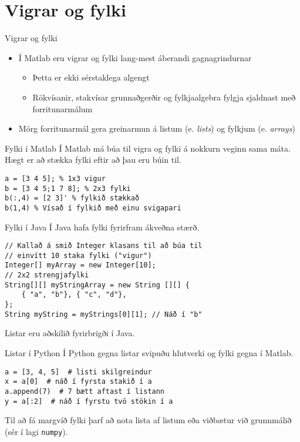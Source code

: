 \documentclass{beamer}
\begin{document}
\section{Vigrar og fylki}

\begin{frame}{Vigrar og fylki}
\begin{itemize}
 \item Í Matlab eru vigrar og fylki lang-mest áberandi gagnagrindurnar
 \begin{itemize}
  \item Þetta er ekki sérstaklega algengt
  \item Rökvísanir, stakvísar grunnaðgerðir og fylkjaalgebra fylgja sjaldnast með forritunarmálum
 \end{itemize}
 \item Mörg forritunarmál gera greinarmun á listum (e. \emph{lists}) og fylkjum (e. \emph{arrays})
\end{itemize}
\end{frame}

\begin{frame}[fragile]{Fylki í Matlab}
Í Matlab má búa til vigra og fylki á nokkurn veginn sama máta. Hægt er að stækka fylki eftir að þau eru búin til.
\begin{verbatim}
a = [3 4 5]; % 1x3 vigur
b = [3 4 5;1 7 8]; % 2x3 fylki
b(:,4) = [2 3]' % fylkið stækkað
b(1,4) % Vísað í fylkið með einu svigapari
\end{verbatim}
\end{frame}

\begin{frame}[fragile]{Fylki í Java}
\vspace{\baselineskip}
Í Java hafa fylki fyrirfram ákveðna stærð. 
\begin{verbatim}
// Kallað á smið Integer klasans til að búa til
// einvítt 10 staka fylki ("vigur")
Integer[] myArray = new Integer[10];
// 2x2 strengjafylki
String[][] myStringArray = new String [][] {
    { "a", "b"}, { "c", "d"}, 
};
String myString = myStrings[0][1]; // Náð í "b"
\end{verbatim}
Listar eru aðskilið fyrirbrigði í Java.
\end{frame}

\begin{frame}[fragile]{Listar í Python}
Í Python gegna listar svipuðu hlutverki og fylki gegna í Matlab.
\begin{verbatim}
a = [3, 4, 5]  # listi skilgreindur
x = a[0]  # náð í fyrsta stakið í a
a.append(7)  # 7 bætt aftast í listann
y = a[:2]  # náð í fyrstu tvö stökin í a
\end{verbatim}
Til að fá margvíð fylki þarf að nota lista af listum eða viðbætur við grunnmálið (sér í lagi \texttt{numpy}).
\end{frame}
\end{document}
